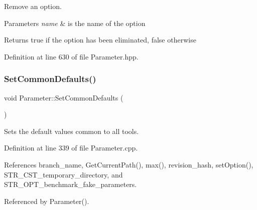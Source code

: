 Remove an option. 


\begin{DoxyParams}{Parameters}
{\em name} & is the name of the option \\
\hline
\end{DoxyParams}
\begin{DoxyReturn}{Returns}
true if the option has been eliminated, false otherwise 
\end{DoxyReturn}


Definition at line 630 of file Parameter.\+hpp.

\mbox{\label{classParameter_a75d63915daccef91941cd50a0dd6f2f1}} 
\subsubsection{\texorpdfstring{Set\+Common\+Defaults()}{SetCommonDefaults()}}
{\footnotesize\ttfamily void Parameter\+::\+Set\+Common\+Defaults (\begin{DoxyParamCaption}{ }\end{DoxyParamCaption})\hspace{0.3cm}{\ttfamily [protected]}}



Sets the default values common to all tools. 



Definition at line 339 of file Parameter.\+cpp.



References branch\+\_\+name, Get\+Current\+Path(), max(), revision\+\_\+hash, set\+Option(), S\+T\+R\+\_\+\+C\+S\+T\+\_\+temporary\+\_\+directory, and S\+T\+R\+\_\+\+O\+P\+T\+\_\+benchmark\+\_\+fake\+\_\+parameters.



Referenced by Parameter().


